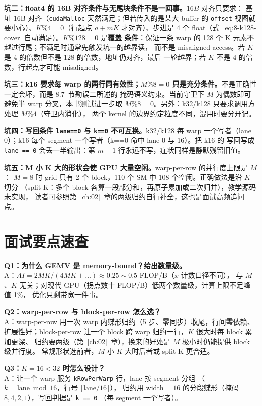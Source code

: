 \textbf{坑二：float4 的 16B 对齐条件与无尾块条件不是一回事。}$16B$ 对齐只要求：
基址 16B 对齐（\texttt{cudaMalloc} 天然满足；但若传入的是某大 buffer 的
\texttt{offset} 视图就要小心）、$K \% 4 = 0$（行起点 $a + mK$ 才对齐）、步进是
4 个 float（式~\ref{eq:8-k128-cover} 自动满足）。$K \% 128 = 0$ 是\textbf{覆盖
条件}：保证一条 warp 的 128 个 K 元素不越过行尾；不满足时通常先触发坑一的越界读，
而不是 misaligned access。若 $K$ 是 4 的倍数但不是 128 的倍数，地址仍对齐，最后
一轮越界；若 $K$ 不是 4 的倍数，行起点才可能 misaligned。

\textbf{坑三：k16 要求每 warp 的两行同有效性；$M \% 8 = 0$ 只是充分条件。}不是正确性一定会坏，而是 8.7~节勘误二所述的
掩码语义约束。当前守卫下 $M$ 为偶数即可避免半 warp 分叉，本书测试进一步取 $M \% 8 = 0$。另外：k32/k128 只要求调用方处理 $M \% 4$（守卫内消化），
两个 kernel 的边界约定粒度不同，混用时要分开记。

\textbf{坑四：写回条件 \texttt{lane==0} 与 \texttt{k==0} 不可互换。}\allowbreak{}k32/k128 每 warp
一个写者（lane 0）；k16 每个 segment 一个写者（k==0 命中 lane 0 与 16）。把 k16 的
写回写成 \texttt{lane == 0} 会丢一半输出：第 $m+1$ 行永远不写，症状同样是静默残留旧值。

\textbf{坑五：M 小 K 大的形状会使 GPU 大量空闲。}\allowbreak{}warp-per-row 的并行度上限是 $M$：
$M = 8$ 时 grid 只有 2 个 block，110 个 SM 中 108 个空闲。正确做法是沿 $K$ 切分
（split-K：多个 block 各算一段部分和，再原子累加或二次归并），教学源码未实现，
读者可参照第~\ref{ch:02}~章的两级归约自行补全，这也是面试高频追问点。

\section{面试要点速查}

\textbf{Q1：为什么 GEMV 是 memory-bound？给出数量级。}\\
A：$AI = 2MK / (4MK + \dots) \approx 0.25 \sim 0.5$ FLOP/B（$x$ 计数口径不同），
与 $M$、$K$ 无关；对现代 GPU（拐点数十 FLOP/B）低两个数量级，计算上限不足峰值 1\%，
优化只剩带宽一件事。

\textbf{Q2：warp-per-row 与 block-per-row 怎么选？}\\
A：warp-per-row 用一次 warp 内蝶形归约（5 步、零同步）收尾，行间零依赖、
扩展性好；block-per-row 让一个 block 跨 warp 归约一行，$K$ 很大时每 block 累加更深、
归约要两级（第~\ref{ch:02}~章），换来的好处是 $M$ 极小时仍能提供 block 级并行度。
常规形状选前者，$M$ 小 $K$ 大时后者或 split-K 更合适。

\textbf{Q3：$K = 16 < 32$ 时怎么设计？}\\
A：让一个 warp 服务 \texttt{kRowPerWarp} 行，lane 按 segment 分组
（$k = \mathrm{lane} \bmod 16$，行号 $\lfloor \mathrm{lane}/16 \rfloor$），
归约用 width$=16$ 的分段蝶形（掩码 $8,4,2,1$），写回判据是 \texttt{k == 0}
（每 segment 一个写者）。

